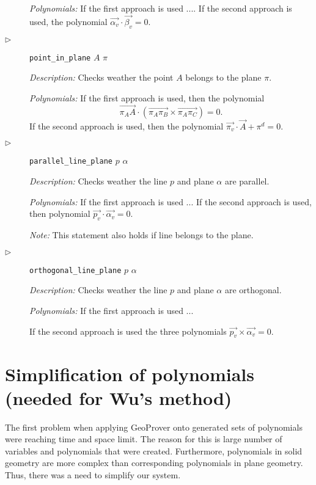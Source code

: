 \documentclass[final,1p,times,authoryear]{elsarticle}
\begin{document}
\begin{description}
{\em Polynomials:} 
If the first approach is used ....
If the second approach is used, the polynomial
$\overrightarrow{\alpha_v} \cdot \overrightarrow{\beta_v} = 0$.

\item[$\triangleright$] {\tt point\_in\_plane} $A$ $\pi$

{\em Description:} Checks weather the point $A$ belongs to the plane
$\pi$.

{\em Polynomials:} If the first approach is used, then the polynomial
$$\overrightarrow{\pi_AA}\cdot (\overrightarrow{\pi_A\pi_B} \times \overrightarrow{\pi_A\pi_C}) = 0.$$
If the second approach is used, then the polynomial
$\overrightarrow{\pi_v} \cdot \overrightarrow{A} + \pi^{d} = 0$.

\item[$\triangleright$] {\tt parallel\_line\_plane} $p$ $\alpha$

{\em Description:} Checks weather the line $p$ and plane $\alpha$ are
parallel.

{\em Polynomials:} 
If the first approach is used ...
If the second approach is used, then polynomial
$\overrightarrow{p_v} \cdot \overrightarrow{\alpha_v} = 0$.

{\em Note:} This statement also holds if line belongs to the plane.

\item[$\triangleright$] {\tt orthogonal\_line\_plane} $p$ $\alpha$

{\em Description:} Checks weather the line $p$ and plane $\alpha$ are
orthogonal.

{\em Polynomials:} If the first approach is used ...

If the second approach is used the three polynomials
$\overrightarrow{p_v} \times \overrightarrow{\alpha_v} = 0$.

\end{description}

\section{Simplification of polynomials (needed for Wu's method)}
\label{simplification}

The first problem when applying GeoProver onto generated sets of
polynomials were reaching time and space limit. The reason for this is
large number of variables and polynomials that were
created. Furthermore, polynomials in solid geometry are more complex
than corresponding polynomials in plane geometry. Thus, there was a
need to simplify our system.
\end{document}
